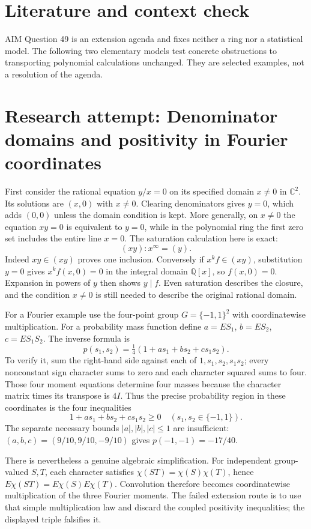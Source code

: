 \documentclass[11pt]{article}
\begin{document}
\section{Literature and context check}
AIM Question 49 is an extension agenda and fixes neither a ring nor a statistical model. The following two elementary models test concrete obstructions to transporting polynomial calculations unchanged. They are selected examples, not a resolution of the agenda.
\section{Research attempt: Denominator domains and positivity in Fourier coordinates}
First consider the rational equation $y/x=0$ on its specified domain $x\ne0$ in $\mathbb C^2$. Its solutions are $(x,0)$ with $x\ne0$. Clearing denominators gives $y=0$, which adds $(0,0)$ unless the domain condition is kept. More generally, on $x\ne0$ the equation $xy=0$ is equivalent to $y=0$, while in the polynomial ring the first zero set includes the entire line $x=0$. The saturation calculation here is exact:
\[
(xy):x^\infty=(y).
\]
Indeed $x y\in(xy)$ proves one inclusion. Conversely if $x^k f\in(xy)$, substitution $y=0$ gives $x^k f(x,0)=0$ in the integral domain $\mathbb Q[x]$, so $f(x,0)=0$. Expansion in powers of $y$ then shows $y\mid f$. Even saturation describes the closure, and the condition $x\ne0$ is still needed to describe the original rational domain.

For a Fourier example use the four-point group $G=\{-1,1\}^2$ with coordinatewise multiplication. For a probability mass function define $a=E S_1$, $b=E S_2$, $c=E S_1S_2$. The inverse formula is
\[
p(s_1,s_2)=\tfrac14(1+a s_1+b s_2+c s_1s_2).
\]
To verify it, sum the right-hand side against each of $1,s_1,s_2,s_1s_2$; every nonconstant sign character sums to zero and each character squared sums to four. Those four moment equations determine four masses because the character matrix times its transpose is $4I$. Thus the precise probability region in these coordinates is the four inequalities
\[
1+a s_1+b s_2+c s_1s_2\ge0\quad(s_1,s_2\in\{-1,1\}).
\]
The separate necessary bounds $|a|,|b|,|c|\le1$ are insufficient: $(a,b,c)=(9/10,9/10,-9/10)$ gives $p(-1,-1)=-17/40$.

There is nevertheless a genuine algebraic simplification. For independent group-valued $S,T$, each character satisfies $\chi(ST)=\chi(S)\chi(T)$, hence $E\chi(ST)=E\chi(S)E\chi(T)$. Convolution therefore becomes coordinatewise multiplication of the three Fourier moments. The failed extension route is to use that simple multiplication law and discard the coupled positivity inequalities; the displayed triple falsifies it.
\end{document}
